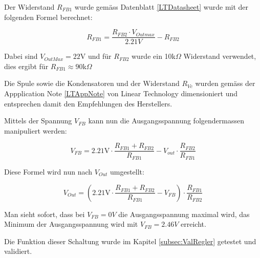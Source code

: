 Der Widerstand $R_{FB1}$ wurde gemäss Datenblatt \ref{LTDatasheet} wurde mit der folgenden Formel berechnet:

\[
R_{FB1}=\frac{R_{FB2}\cdot V_{Outmax}}{2.21V}-R_{FB2}
\]

Dabei sind $V_{OutMax} =22$V und für $R_{FB2}$ wurde ein 10k$\Omega$ Widerstand verwendet, dies ergibt für $R_{FB1} \approx 90$k$\Omega$

Die Spule sowie die Kondensatoren und der Widerstand $R_{Vc}$ wurden gemäss der Appplication Note \ref{LTAppNote} von Linear Technology dimensioniert und entsprechen damit den Empfehlungen des Herstellers.

Mittels der Spannung $V_{FB}$ kann nun die Ausgangsspannung folgendermassen manipuliert werden:

\[
V_{FB}=2.21\text{V}\cdot\frac{R_{FB1}+R_{FB2}}{R_{FB1}}-V_{out}\cdot\frac{R_{FB2}}{R_{FB1}}
\]

Diese Formel wird nun nach $V_{Out}$ umgestellt:

\[
V_{Out} = \left(2.21\text{V}\cdot\frac{R_{FB1}+R_{FB2}}{R_{FB1}} - V_{FB}\right) \cdot\frac{R_{FB1}}{R_{FB2}}
\]

Man sieht sofort, dass bei $V_{FB}=0V$ die Ausgangsspannung maximal wird, das Minimum der Ausgangsspannung wird mit $V_{FB}=2.46V$  erreicht.

Die Funktion dieser Schaltung wurde im Kapitel \ref{subsec:ValRegler} getestet und validiert.

%
